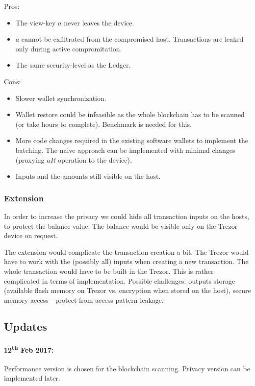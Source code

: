 \documentclass[]{article}
\begin{document}
\noindent Pros:
\begin{itemize}
	\item The view-key $a$ never leaves the device.
	\item $a$ cannot be exfiltrated from the compromised host. Transactions are leaked only during active compromitation.
	\item The same security-level as the Ledger.
\end{itemize}

\noindent Cons:
\begin{itemize}
	\item Slower wallet synchronization.
	\item Wallet restore could be infeasible as the whole blockchain has to be scanned (or take hours to complete). Benchmark is needed for this.
	\item More code changes required in the existing software wallets to implement the batching. The naive approach can be implemented with minimal changes (proxying $aR$ operation to the device).
	\item Inputs and the amounts still visible on the host.
\end{itemize}

\subsubsection{Extension} In order to increase the privacy we could hide all transaction inputs on the hosts, to protect the balance value. The balance would be visible only on the Trezor device on request.

The extension would complicate the transaction creation a bit. The Trezor would have to work with the (possibly all) inputs when creating a new transaction. The whole transaction would have to be built in the Trezor. This is rather complicated in terms of implementation. Possible challenges: outputs storage (available flash memory on Trezor vs. encryption when stored on the host), secure memory access - protect from access pattern leakage.

\subsection{Updates}

\paragraph{12\textsuperscript{th} Feb 2017:} Performance version is chosen for the blockchain scanning. Privacy version can be implemented later.
\end{document}
